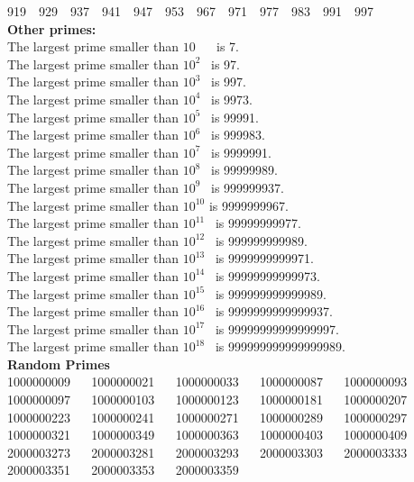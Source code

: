 \documentclass[10pt, twocolumn]{article}
\begin{document}
\begin{flushleft}
919$\quad$929$\quad$937$\quad$941$\quad$947$\quad$953$\quad$967$\quad$971$\quad$977$\quad$983$\quad$991$\quad$997\\[0.5cm]


\textbf{Other primes:}\\
The largest prime smaller than $10$   $\quad$  is 7.\\
The largest prime smaller than $10^2$    $\,$  is 97.\\
The largest prime smaller than $10^3$    $\,$  is 997.\\
The largest prime smaller than $10^4$    $\,$  is 9973.\\
The largest prime smaller than $10^5$    $\,$  is 99991.\\
The largest prime smaller than $10^6$    $\,$  is 999983.\\
The largest prime smaller than $10^7$    $\,$  is 9999991.\\
The largest prime smaller than $10^8$    $\,$  is 99999989.\\
The largest prime smaller than $10^9$    $\,$  is 999999937.\\
The largest prime smaller than $10^{10}$       is 9999999967.\\
The largest prime smaller than $10^{11}$ $\,$  is 99999999977.\\
The largest prime smaller than $10^{12}$ $\,$  is 999999999989.\\
The largest prime smaller than $10^{13}$ $\,$  is 9999999999971.\\
The largest prime smaller than $10^{14}$ $\,$  is 99999999999973.\\
The largest prime smaller than $10^{15}$ $\,$  is 999999999999989.\\
The largest prime smaller than $10^{16}$ $\,$  is 9999999999999937.\\
The largest prime smaller than $10^{17}$ $\,$  is 99999999999999997.\\
The largest prime smaller than $10^{18}$ $\,$  is 999999999999999989.\\[0.5cm]

\textbf{Random Primes}\\
1000000009 $\quad$ 1000000021 $\quad$ 1000000033 $\quad$ 1000000087 $\quad$ 1000000093
1000000097 $\quad$ 1000000103 $\quad$ 1000000123 $\quad$ 1000000181 $\quad$ 1000000207
1000000223 $\quad$ 1000000241 $\quad$ 1000000271 $\quad$ 1000000289 $\quad$ 1000000297
1000000321 $\quad$ 1000000349 $\quad$ 1000000363 $\quad$ 1000000403 $\quad$ 1000000409
2000003273 $\quad$ 2000003281 $\quad$ 2000003293 $\quad$ 2000003303 $\quad$ 2000003333
2000003351 $\quad$ 2000003353 $\quad$ 2000003359\\[0.5cm]




\end{flushleft}
\end{document}
